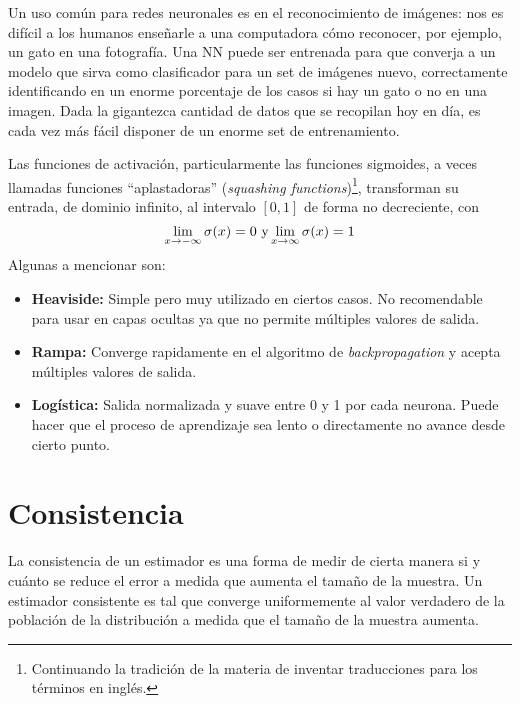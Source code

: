 \documentclass[12pt]{extarticle}
\newenvironment{comentarios_meta}
    {\begin{framed}\noindent\textcolor{red}{\textbf{\#}}}
    {\end{framed}}
\begin{document}
    Un uso común para redes neuronales es en el reconocimiento de imágenes: nos es difícil a los humanos enseñarle a una computadora cómo reconocer, por ejemplo, un gato en una fotografía. Una NN puede ser entrenada para que converja a un modelo que sirva como clasificador para un set de imágenes nuevo, correctamente identificando en un enorme porcentaje de los casos si hay un gato o no en una imagen. Dada la gigantezca cantidad de datos que se recopilan hoy en día, es cada vez más fácil disponer de un enorme set de entrenamiento.
    
    Las funciones de activación, particularmente las funciones sigmoides, a veces llamadas funciones ``aplastadoras'' (\textit{squashing functions})\footnote{Continuando la tradición de la materia de inventar traducciones para los términos en inglés.}, transforman su entrada, de dominio infinito, al intervalo $[0,1]$ de forma no decreciente, con
    \begin{equation*}
        \lim_{x \to -\infty} \sigma(x) = 0
        \textnormal{ y}
        \lim_{x \to \infty} \sigma(x) = 1
    \end{equation*}
    Algunas a mencionar son:
    \begin{itemize}
        \item \textbf{Heaviside:} Simple pero muy utilizado en ciertos casos. No recomendable para usar en capas ocultas ya que no permite múltiples valores de salida.
        \item \textbf{Rampa:} Converge rapidamente en el algoritmo de \textit{backpropagation} y acepta múltiples valores de salida.
        \item \textbf{Logística:} Salida normalizada y suave entre 0 y 1 por cada neurona. Puede hacer que el proceso de aprendizaje sea lento o directamente no avance desde cierto punto.
    \end{itemize}

\section{Consistencia}

    La consistencia de un estimador es una forma de medir de cierta manera si y cuánto se reduce el error a medida que aumenta el tamaño de la muestra. Un estimador consistente es tal que converge uniformemente al valor verdadero de la población de la distribución a medida que el tamaño de la muestra aumenta.
    
\end{document}
